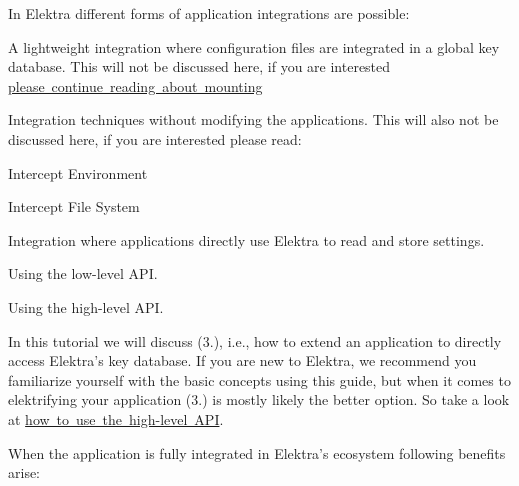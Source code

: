 In Elektra different forms of application integrations are possible\+:


\begin{DoxyEnumerate}
\item A lightweight integration where configuration files are integrated in a global key database. This will not be discussed here, if you are interested \mbox{\hyperlink{doc_tutorials_mount_md}{please continue reading about mounting}}
\item Integration techniques without modifying the applications. This will also not be discussed here, if you are interested please read\+:
\begin{DoxyItemize}
\item Intercept Environment
\item Intercept File System
\end{DoxyItemize}
\item Integration where applications directly use Elektra to read and store settings.
\begin{DoxyEnumerate}
\item Using the low-\/level A\+PI.
\item Using the high-\/level A\+PI.
\end{DoxyEnumerate}
\end{DoxyEnumerate}

In this tutorial we will discuss (3.), i.\+e., how to extend an application to directly access Elektra’s key database. If you are new to Elektra, we recommend you familiarize yourself with the basic concepts using this guide, but when it comes to elektrifying your application (3.) is mostly likely the better option. So take a look at \mbox{\hyperlink{doc_tutorials_highlevel_md}{how to use the high-\/level A\+PI}}.

When the application is fully integrated in Elektra’s ecosystem following benefits arise\+:


